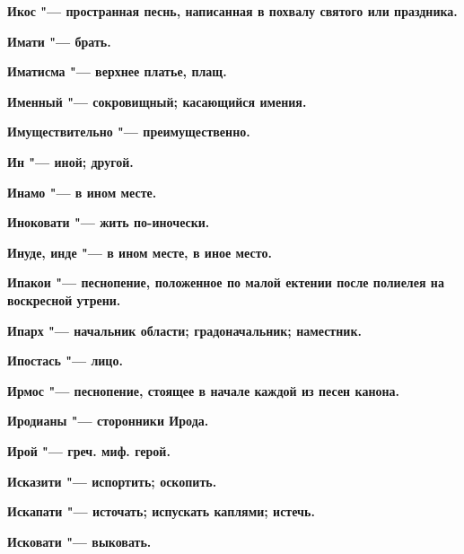 \bfseries Икос \normalfont{} "--- пространная песнь, написанная в похвалу святого или праздника. 




\bfseries Имати \normalfont{} "--- брать. 




\bfseries Иматисма \normalfont{} "--- верхнее платье, плащ. 




\bfseries Именный \normalfont{} "--- сокровищный; касающийся имения. 




\bfseries Имуществительно \normalfont{} "--- преимущественно. 




\bfseries Ин \normalfont{} "--- иной; другой. 




\bfseries Инамо \normalfont{} "--- в ином месте. 




\bfseries Иноковати \normalfont{} "--- жить по-иночески. 




\bfseries Инуде, инде \normalfont{} "--- в ином месте, в иное место. 




\bfseries Ипакои \normalfont{} "--- песнопение, положенное по малой ектении после полиелея на воскресной утрени. 




\bfseries Ипарх \normalfont{} "--- начальник области; градоначальник; наместник. 




\bfseries Ипостась \normalfont{} "--- лицо. 




\bfseries Ирмос \normalfont{} "--- песнопение, стоящее в начале каждой из песен канона. 




\bfseries Иродианы \normalfont{} "--- сторонники Ирода. 




\bfseries Ирой \normalfont{} "--- греч. миф. герой. 




\bfseries Исказити \normalfont{} "--- испортить; оскопить. 




\bfseries Искапати \normalfont{} "--- источать; испускать каплями; истечь. 




\bfseries Исковати \normalfont{} "--- выковать. 




